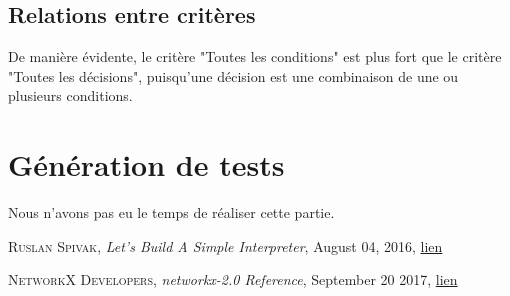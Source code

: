 \documentclass[a4paper]{article}
\begin{document}
\subsection{Relations entre critères}

De manière évidente, le critère "Toutes les conditions" est plus fort que le critère "Toutes les décisions", puisqu'une décision est une combinaison de une ou plusieurs conditions. 

\section{Génération de tests}

Nous n'avons pas eu le temps de réaliser cette partie. 

\begin{thebibliography}{xx}
  \textsc{Ruslan Spivak}, \textit{Let’s Build A Simple Interpreter}, August 04, 2016, \href{https://ruslanspivak.com/lsbasi-part10/}{lien}
  
  \textsc{NetworkX Developers}, \textit{networkx-2.0 Reference}, September 20 2017, \href{https://networkx.github.io/documentation/networkx-2.0/}{lien}

\end{thebibliography}
\end{document}
